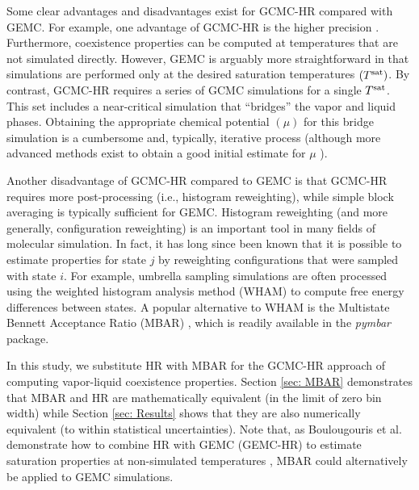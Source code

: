 \documentclass[journal=jced,manuscript=article]{achemso}
\begin{document}
Some clear advantages and disadvantages exist for GCMC-HR compared with GEMC. For example, one advantage of GCMC-HR is the higher precision \cite{GEMC_GCMC}. Furthermore, coexistence properties can be computed at temperatures that are not simulated directly. However, GEMC is arguably more straightforward in that simulations are performed only at the desired saturation temperatures $(T^{\rm sat})$. By contrast, GCMC-HR requires a series of GCMC simulations for a single $T^{\rm sat}$. This set includes a near-critical simulation that ``bridges'' the vapor and liquid phases. Obtaining the appropriate chemical potential $(\mu)$ for this bridge simulation is a cumbersome and, typically, iterative process (although more advanced methods exist to obtain a good initial estimate for $\mu$ \cite{Hemmen2015}).

Another disadvantage of GCMC-HR compared to GEMC is that GCMC-HR requires more post-processing (i.e., histogram reweighting), while simple block averaging is typically sufficient for GEMC. Histogram reweighting (and more generally, configuration reweighting) is an important tool in many fields of molecular simulation. In fact, it has long since been known that it is possible to estimate properties for state $j$ by reweighting configurations that were sampled with state $i$. \cite{McDonald1967,Card1970,Wood1968,Pana2000} For example, umbrella sampling simulations are often processed using the weighted histogram analysis method (WHAM) to compute free energy differences between states. A popular alternative to WHAM is the Multistate Bennett Acceptance Ratio (MBAR) \cite{chodera:jctc:2007,shirts-chodera:jcp:2008:mbar}, which is readily available in the \textit{pymbar} package.

In this study, we substitute HR with MBAR for the GCMC-HR approach of computing vapor-liquid coexistence properties. Section \ref{sec: MBAR} demonstrates that MBAR and HR are mathematically equivalent (in the limit of zero bin width) while Section \ref{sec: Results} shows that they are also numerically equivalent (to within statistical uncertainties). Note that, as Boulougouris et al. demonstrate how to combine HR with GEMC (GEMC-HR) to estimate saturation properties at non-simulated temperatures \cite{Boulougouris2010}, MBAR could alternatively be applied to GEMC simulations.


\end{document}
